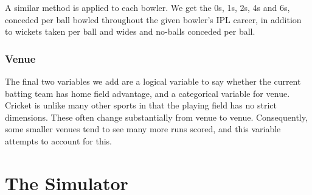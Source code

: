
A similar method is applied to each bowler. We get the 0s, 1s, 2s, 4s and 6s, conceded per ball bowled throughout the given bowler’s IPL career, in addition to wickets taken per ball and wides and no-balls conceded per ball.

\subsubsection{Venue}

The final two variables we add are a logical variable to say whether the current batting team has home field advantage, and a categorical variable for venue. Cricket is unlike many other sports in that the playing field has no strict dimensions. These often change substantially from venue to venue. Consequently, some smaller venues tend to see many more runs scored, and this variable attempts to account for this.

\section{The Simulator}
\label{sec: sim}














